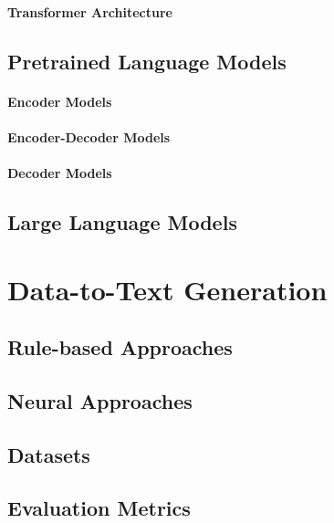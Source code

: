 \paragraph{Transformer Architecture}
\subsection{Pretrained Language Models}
\label{sec:plms}

\paragraph{Encoder Models}

\paragraph{Encoder-Decoder Models}

\paragraph{Decoder Models}

\subsection{Large Language Models}
\label{sec:llms}
\section{Data-to-Text Generation}
\label{sec:d2t}
\subsection{Rule-based Approaches}
\label{sec:rule-d2t}
\subsection{Neural Approaches}
\label{sec:neural-d2t}
\subsection{Datasets}
\label{sec:datasets}
\subsection{Evaluation Metrics}
\label{sec:evaluation}